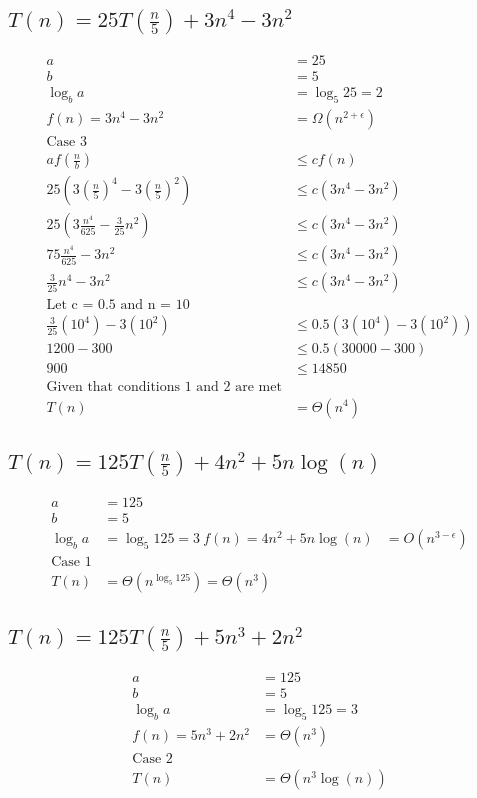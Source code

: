 \documentclass{article}
\begin{document}
    \subsection{\(T(n) = 25T(\frac{n}{5}) + 3n^4 - 3n^2\)}
      \begin{align*}
      a &= 25 \\
      b &= 5 \\
      \log_b{a} &= \log_5{25} = 2 \\
      f(n) = 3n^4 - 3n^2 &= \Omega(n^{2 + \epsilon}) \\
      \text{Case 3} \\
      af(\frac{n}{b}) & \leq cf(n) \\
      25(3(\frac{n}{5})^4 - 3(\frac{n}{5})^2) & \leq c(3n^4 - 3n^2) \\
      25(3 \frac{n^4}{625} - \frac{3}{25} n^2) & \leq c(3n^4 - 3n^2) \\
      75 \frac{n^4}{625} - 3n^2 & \leq c(3n^4 - 3n^2) \\
      \frac{3}{25} n^4 - 3n^2 & \leq c(3n^4 - 3n^2) \\
      \text{Let c = 0.5 and n = 10} \\
      \frac{3}{25} (10^4) - 3(10^2) & \leq 0.5(3(10^4) - 3(10^2)) \\
      1200 - 300 & \leq 0.5(30000 - 300) \\
      900 & \leq 14850 \\
      \text{Given that conditions 1 and 2 are met} \\
      T(n) & = \Theta(n^4)
      \end{align*}

    \subsection{\(T(n) = 125T(\frac{n}{5}) + 4n^2 + 5n \log(n)\)}
      \begin{align*}
        a &= 125 \\
        b &= 5 \\
        \log_b{a} &= \log_5{125} = 3 \
        f(n) = 4n^2 + 5n \log(n) &= O(n^{3 - \epsilon}) \\
        \text{Case 1} \\
        T(n) &= \Theta(n^{\log_5{125}}) = \Theta(n^3)
      \end{align*}

    \subsection{\(T(n) = 125T(\frac{n}{5}) + 5n^3 + 2n^2\)}
      \begin{align*}
        a &= 125 \\
        b &= 5 \\
        \log_b{a} &= \log_5{125} = 3 \\
        f(n) = 5n^3 + 2n^2 &= \Theta(n^3) \\
        \text{Case 2} \\
        T(n) &= \Theta(n^3 \log(n))
      \end{align*}
\end{document}
